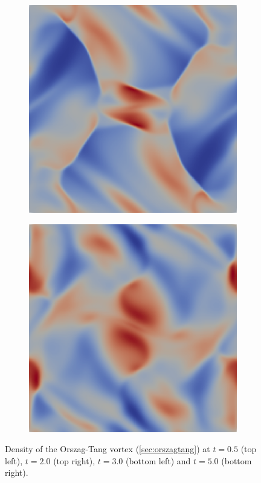 \documentclass[a4paper]{article}
\begin{document}
\begin{figure}[h]
\begin{subfigure}[b]{0.49\textwidth}
  \end{subfigure}
  \begin{subfigure}[b]{0.49\textwidth}
    \centering
    \includegraphics[width=\textwidth]{results/orszag_tang3}
  \end{subfigure}
  \begin{subfigure}[b]{0.49\textwidth}
    \centering
    \includegraphics[width=\textwidth]{results/orszag_tang5}
  \end{subfigure}
  \caption{Density of the Orszag-Tang vortex (\autoref{sec:orszagtang}) at
    $t=0.5$ (top left), $t=2.0$ (top right), $t=3.0$ (bottom left) and $t=5.0$
    (bottom right).}
  \label{fig:orszagtang}
\end{figure}

\clearpage


\end{document}
